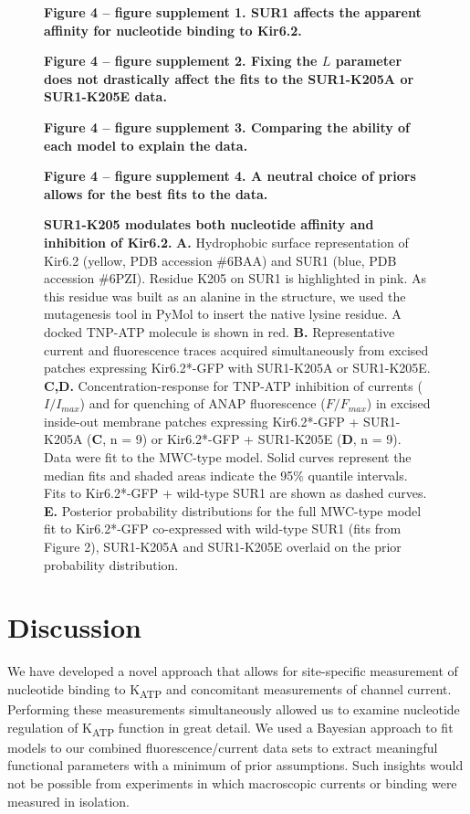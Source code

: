 \documentclass[10pt,lineno, doublespacing]{elife}
\begin{document}
\begin{figure}\ContinuedFloat
\begin{fullwidth}
\caption{
\textbf{SUR1-K205 modulates both nucleotide affinity and inhibition of Kir6.2.}
\textbf{A.}
Hydrophobic surface representation of Kir6.2 (yellow, PDB accession \#6BAA) and SUR1 (blue, PDB accession \#6PZI).
Residue K205 on SUR1 is highlighted in pink.
As this residue was built as an alanine in the structure, we used the mutagenesis tool in PyMol to insert the native lysine residue.
A docked TNP-ATP molecule is shown in red.
\textbf{B.}
Representative current and fluorescence traces acquired simultaneously from excised patches expressing Kir6.2*-GFP with SUR1-K205A or SUR1-K205E.
\textbf{C,D.}
Concentration-response for TNP-ATP inhibition of currents ($I/I_{max}$) and for quenching of ANAP fluorescence ($F/F_{max}$) in excised inside-out membrane patches expressing Kir6.2*-GFP + SUR1-K205A (\textbf{C}, n = 9) or Kir6.2*-GFP + SUR1-K205E (\textbf{D}, n = 9).
Data were fit to the MWC-type model.
Solid curves represent the median fits and shaded areas indicate the 95\% quantile intervals.
Fits to Kir6.2*-GFP + wild-type SUR1 are shown as dashed curves.
\textbf{E.}
Posterior probability distributions for the full MWC-type model fit to Kir6.2*-GFP co-expressed with wild-type SUR1 (fits from Figure 2), SUR1-K205A and SUR1-K205E overlaid on the prior probability distribution.
}
\raggedright
\textbf{\small Figure 4 -- figure supplement 1. SUR1 affects the apparent affinity for nucleotide binding to Kir6.2.}

\textbf{\small Figure 4 -- figure supplement 2. Fixing the $L$ parameter does not drastically affect the fits to the SUR1-K205A or SUR1-K205E data.}

\textbf{\small Figure 4 -- figure supplement 3. Comparing the ability of each model to explain the data. }

\textbf{\small Figure 4 -- figure supplement 4. A neutral choice of priors allows for the best fits to the data.}
\end{fullwidth}
\end{figure}

\section{Discussion}

We have developed a novel approach that allows for site-specific measurement of nucleotide binding to K\textsubscript{ATP} and concomitant measurements of channel current.
Performing these measurements simultaneously allowed us to examine nucleotide regulation of K\textsubscript{ATP} function in great detail.
We used a Bayesian approach to fit models to our combined fluorescence/current data sets to extract meaningful functional parameters with a minimum of prior assumptions.
Such insights would not be possible from experiments in which macroscopic currents or binding were measured in isolation.
\end{document}
